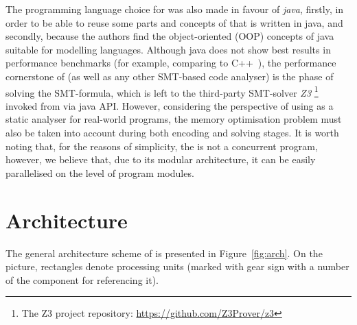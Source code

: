 The programming language choice for \porthos[2] was also made in favour of \textit{java}, firstly, in order to be able to reuse some parts and concepts of \porthos[1] that is written in java, and secondly, because the authors find the object-oriented (OOP) concepts of java suitable for modelling languages.
Although java does not show best results in performance benchmarks (for example, comparing to C++~\cite{hundt2011loop, oaks2014java}), the performance cornerstone of \porthos[2] (as well as any other SMT-based code analyser) is the phase of solving the SMT-formula, which is left to the third-party SMT-solver \textit{Z3}%
\footnote{The Z3 project repository: \url{https://github.com/Z3Prover/z3}} %
invoked from \porthos[2] via java API.
However, considering the perspective of using \porthos[2] as a static analyser for real-world programs, the memory optimisation problem must also be taken into account during both encoding and solving stages.
It is worth noting that, for the reasons of simplicity, the \porthos[2] is not a concurrent program, however, we believe that, due to its modular architecture, it can be easily parallelised on the level of program modules.


\section{Architecture}
\label{ch:impl:arch}

The general architecture scheme of \porthos[2] is presented in Figure~\ref{fig:arch}. On the picture, rectangles denote processing units (marked with gear sign with a number of the component for referencing it).

